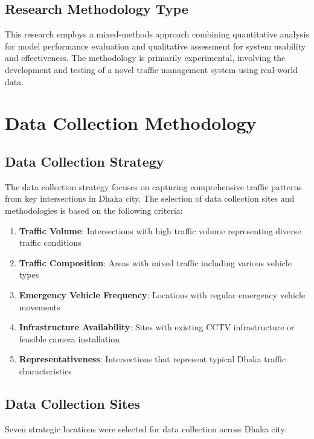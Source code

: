 \subsection{Research Methodology Type}

This research employs a mixed-methods approach combining quantitative analysis for model performance evaluation and qualitative assessment for system usability and effectiveness. The methodology is primarily experimental, involving the development and testing of a novel traffic management system using real-world data.

\section{Data Collection Methodology}

\subsection{Data Collection Strategy}

The data collection strategy focuses on capturing comprehensive traffic patterns from key intersections in Dhaka city. The selection of data collection sites and methodologies is based on the following criteria:

\begin{enumerate}
    \item \textbf{Traffic Volume}: Intersections with high traffic volume representing diverse traffic conditions
    \item \textbf{Traffic Composition}: Areas with mixed traffic including various vehicle types
    \item \textbf{Emergency Vehicle Frequency}: Locations with regular emergency vehicle movements
    \item \textbf{Infrastructure Availability}: Sites with existing CCTV infrastructure or feasible camera installation
    \item \textbf{Representativeness}: Intersections that represent typical Dhaka traffic characteristics
\end{enumerate}

\subsection{Data Collection Sites}

Seven strategic locations were selected for data collection across Dhaka city:

